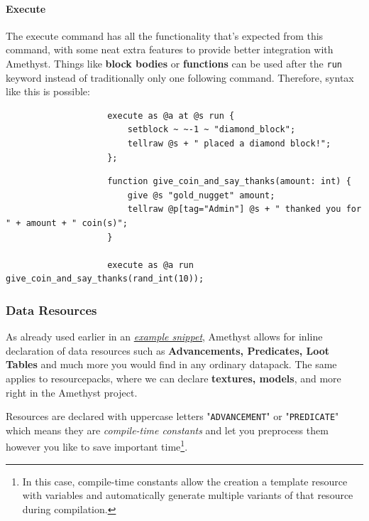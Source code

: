 \documentclass[12pt]{article}
\begin{document}
            \paragraph{Execute} The execute command has all the functionality that's expected from this command, with some neat extra features to provide better integration with Amethyst. Things like \textbf{block bodies} or \textbf{functions} can be used after the \lstinline{run} keyword instead of traditionally only one following command. Therefore, syntax like this is possible:
            
                \begin{lstlisting}
                    execute as @a at @s run {
                        setblock ~ ~-1 ~ "diamond_block";
                        tellraw @s + " placed a diamond block!";
                    };
                \end{lstlisting}
                
                 \begin{lstlisting}
                    function give_coin_and_say_thanks(amount: int) {
                        give @s "gold_nugget" amount;
                        tellraw @p[tag="Admin"] @s + " thanked you for " + amount + " coin(s)";
                    }
                    
                    execute as @a run give_coin_and_say_thanks(rand_int(10));
                \end{lstlisting}
                
        \subsubsection{Data Resources}
            As already used earlier in an \textit{\hyperref[first_data_resource]{example snippet}}, Amethyst allows for inline declaration of data resources such as \textbf{Advancements, Predicates, Loot Tables} and much more you would find in any ordinary datapack. The same applies to resourcepacks, where we can declare \textbf{textures, models}, and more right in the Amethyst project.
            
            Resources are declared with uppercase letters "\lstinline{ADVANCEMENT}" or "\lstinline{PREDICATE}" which means they are \textit{compile-time constants} and let you preprocess them however you like to save important time\footnote{In this case, compile-time constants allow the creation a template resource with variables and automatically generate multiple variants of that resource during compilation.}.
            
\end{document}
